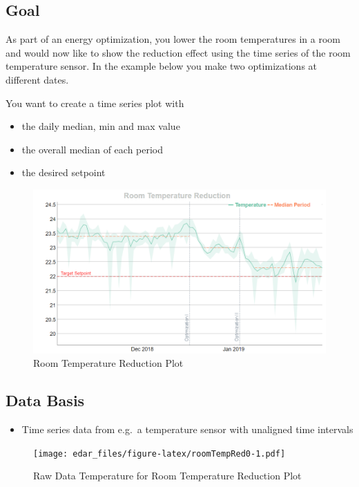 \documentclass[
]{book}
\providecommand{\tightlist}{%
  \setlength{\itemsep}{0pt}\setlength{\parskip}{0pt}}
\begin{document}
\hypertarget{goal-15}{%
\subsection{Goal}\label{goal-15}}

As part of an energy optimization, you lower the room temperatures in a room and would now like to show the reduction effect using the time series of the room temperature sensor. In the example below you make two optimizations at different dates.

You want to create a time series plot with

\begin{itemize}
\item
  the daily median, min and max value
\item
  the overall median of each period
\item
  the desired setpoint
\end{itemize}

\begin{figure}
\includegraphics[width=0.7\linewidth]{images/roomTempRed} \caption{Room Temperature Reduction Plot}\label{fig:unnamed-chunk-25}
\end{figure}

\hypertarget{data-basis-15}{%
\subsection{Data Basis}\label{data-basis-15}}

\begin{itemize}
\tightlist
\item
  Time series data from e.g.~a temperature sensor with unaligned time intervals
\end{itemize}

\begin{figure}
\centering
\texttt{[image: edar\_files/figure-latex/roomTempRed0-1.pdf]}
\caption{\label{fig:roomTempRed0}Raw Data Temperature for Room Temperature Reduction Plot}
\end{figure}
\end{document}
